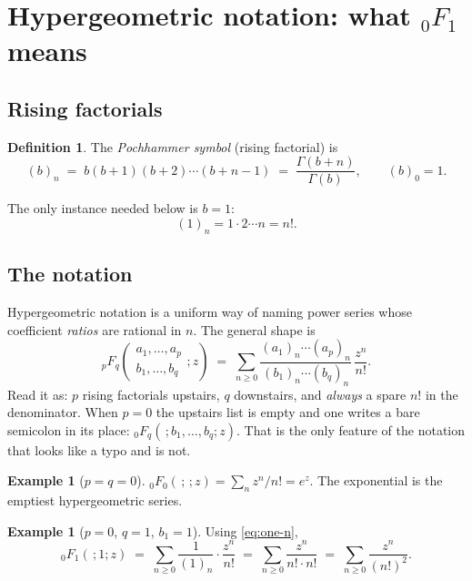 \documentclass[11pt,a4paper]{article}
\theoremstyle{definition}
\newtheorem{definition}[theorem]{Definition}
\newtheorem{example}[theorem]{Example}
\theoremstyle{remark}
\begin{document}
\section{Hypergeometric notation: what ${}_0F_1$ means}

\subsection{Rising factorials}

\begin{definition}\label{def:poch}
The \emph{Pochhammer symbol} (rising factorial) is
\[
  (b)_n \;=\; b(b+1)(b+2)\cdots(b+n-1) \;=\; \frac{\Gamma(b+n)}{\Gamma(b)},
  \qquad (b)_0 = 1 .
\]
\end{definition}

The only instance needed below is $b = 1$:
\begin{equation}\label{eq:one-n}
  (1)_n = 1\cdot 2 \cdots n = n! .
\end{equation}

\subsection{The notation}

Hypergeometric notation is a uniform way of naming power series whose coefficient
\emph{ratios} are rational in $n$. The general shape is
\begin{equation}\label{eq:pFq}
  {}_pF_q\!\left(\begin{matrix} a_1,\dots,a_p \\ b_1,\dots,b_q\end{matrix}; z\right)
  \;=\; \sum_{n \ge 0}
  \frac{(a_1)_n \cdots (a_p)_n}{(b_1)_n\cdots(b_q)_n}\,\frac{z^n}{n!} .
\end{equation}
Read it as: $p$ rising factorials upstairs, $q$ downstairs, and \emph{always} a
spare $n!$ in the denominator. When $p = 0$ the upstairs list is empty and one writes
a bare semicolon in its place: ${}_0F_q(\,;b_1,\dots,b_q;z)$. That is the only feature
of the notation that looks like a typo and is not.

\begin{example}[$p = q = 0$]\label{ex:exp}
${}_0F_0(\,;\,;z) = \sum_n z^n/n! = e^z$. The exponential is the emptiest
hypergeometric series.
\end{example}

\begin{example}[$p=0$, $q=1$, $b_1 = 1$]\label{ex:0F1}
Using \eqref{eq:one-n},
\[
  {}_0F_1(\,;1;z) \;=\; \sum_{n\ge0}\frac{1}{(1)_n}\cdot\frac{z^n}{n!}
  \;=\; \sum_{n \ge 0}\frac{z^n}{n!\cdot n!} \;=\; \sum_{n\ge0}\frac{z^n}{(n!)^2}.
\]
\end{example}
\end{document}
